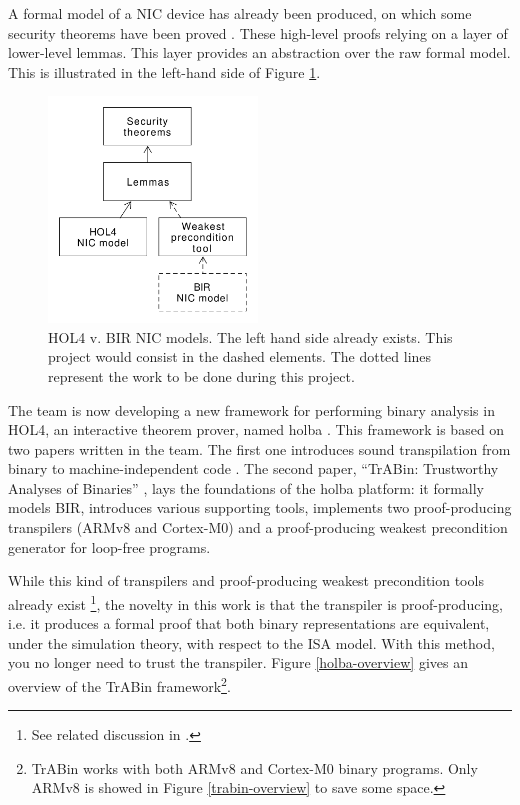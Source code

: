 \documentclass{kththesis}
\begin{document}
A formal model of a \gls{NIC} device has already been produced, on which some security theorems have been proved \cite{haglund_formal_2016}. These high-level proofs relying on a layer of lower-level lemmas. This layer provides an abstraction over the raw formal model. This is illustrated in the left-hand side of Figure \ref{hol-v-bir-nic-model-simple}.

\begin{figure}[ht]
	\includegraphics[height=6cm]{figures/hol-v-bir-nic-model-simple.png}
	\centering
	\caption{HOL4 v. BIR NIC models. The left hand side already exists. This project would consist in the dashed elements. The dotted lines represent the work to be done during this project.}
	\label{hol-v-bir-nic-model-simple}
\end{figure}

The team is now developing a new framework for performing binary analysis in HOL4, an interactive theorem prover, named \gls{holba} \cite{noauthor_holba_2019}. This framework is based on two papers written in the team. The first one introduces sound \gls{transpilation} from binary to machine-independent code \footnotemark \cite{metere_sound_2017}. The second paper, ``TrABin: Trustworthy Analyses of Binaries'' \cite{lindner_trabin:_2019}, lays the foundations of the \gls{holba} platform: it formally models \gls{BIR}, introduces various supporting tools, implements two \gls{proof-producing} \glspl{transpiler} (ARMv8 and Cortex-M0) and a proof-producing weakest precondition generator for loop-free programs.


While this kind of \glspl{transpiler} and \gls{proof-producing} weakest precondition tools already exist \footnote{See related discussion in \cite{lindner_trabin:_2019}.}, the novelty in this work is that the transpiler is proof-producing, i.e. it produces a formal proof that both binary representations are equivalent, under the simulation theory, with respect to the \gls{ISA} model. With this method, you no longer need to trust the transpiler. Figure \ref{holba-overview} gives an overview of the TrABin framework\footnote{TrABin works with both ARMv8 and Cortex-M0 binary programs. Only ARMv8 is showed in Figure \ref{trabin-overview} to save some space.}.
\end{document}
